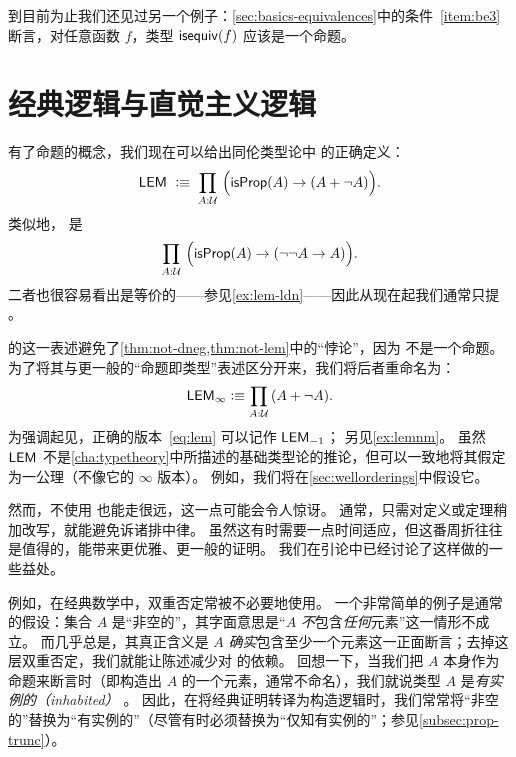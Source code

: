 到目前为止我们还见过另一个例子：\cref{sec:basics-equivalences}中的条件~\ref{item:be3}断言，对任意函数 $f$，类型 $\mathsf{isequiv} (f)$ 应该是一个命题。

%
%

\section{经典逻辑与直觉主义逻辑}
\label{sec:intuitionism}

%
%
有了命题的概念，我们现在可以给出同伦类型论中
%
%
%
的正确定义：
\begin{equation}
  \label{eq:lem}
  \LEM{}\;\defeq\;
  \prd{A:\UU} \Big(\isprop(A) \to (A + \neg A)\Big).
\end{equation}
类似地，
%
%
%
是
\begin{equation}
  \label{eq:ldn}
  \prd{A:\UU} \Big(\isprop(A) \to (\neg\neg A \to A)\Big).
\end{equation}
二者也很容易看出是等价的——参见\cref{ex:lem-ldn}——因此从现在起我们通常只提 \LEM{}。

\LEM{} 的这一表述避免了\cref{thm:not-dneg,thm:not-lem}中的``悖论''，因为 \bool 不是一个命题。
为了将其与更一般的``命题即类型''表述区分开来，我们将后者重命名为：
\begin{equation*}
  \LEM\infty \defeq \prd{A:\UU} (A + \neg A).
\end{equation*}
为强调起见，正确的版本~\eqref{eq:lem}
可以记作 $\mathsf{LEM}_{-1}$；
另见\cref{ex:lemnm}。
虽然 $\mathsf{LEM}_{}$
不是\cref{cha:typetheory}中所描述的基础类型论的推论，但可以一致地将其假定为一公理（不像它的 $\infty$ 版本）。
例如，我们将在\cref{sec:wellorderings}中假设它。

然而，不使用 \LEM{} 也能走很远，这一点可能会令人惊讶。
通常，只需对定义或定理稍加改写，就能避免诉诸排中律。
虽然这有时需要一点时间适应，但这番周折往往是值得的，能带来更优雅、更一般的证明。
我们在引论中已经讨论了这样做的一些益处。

例如，在经典数学中，双重否定常被不必要地使用。
一个非常简单的例子是通常的假设：集合 $A$ 是“非空的”，其字面意思是“$A$ \emph{不}包含\emph{任何}元素”这一情形不成立。
而几乎总是，其真正含义是 $A$ \emph{确实}包含至少一个元素这一正面断言；去掉这层双重否定，我们就能让陈述减少对 \LEM{} 的依赖。
回想一下，当我们把 $A$ 本身作为命题来断言时（即构造出 $A$ 的一个元素，通常不命名），我们就说类型 $A$ 是\emph{有实例的（inhabited）}
%
。
因此，在将经典证明转译为构造逻辑时，我们常常将“非空的”替换为“有实例的”（尽管有时必须替换为“仅知有实例的”；参见\cref{subsec:prop-trunc}）。

